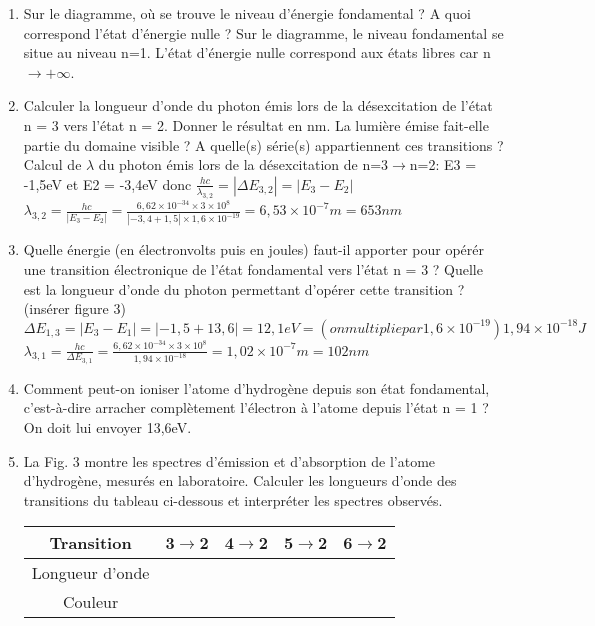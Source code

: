 \documentclass{article}
\begin{document}
\begin{enumerate}
    \item Sur le diagramme, où se trouve le niveau d’énergie fondamental ? A quoi correspond l’état d’énergie nulle ?\newline
    Sur le diagramme, le niveau fondamental se situe au niveau n=1. L'état d'énergie nulle correspond aux états libres car n$\to +\infty$.
    \item Calculer la longueur d’onde du photon émis lors de la désexcitation de l’état n = 3 vers l’état n = 2. Donner le résultat en nm. La lumière émise fait-elle partie du domaine visible ? A quelle(s) série(s) appartiennent ces transitions ?\newline
    Calcul de $\lambda$ du photon émis lors de la désexcitation de n=3$\to$n=2:
    E3 = -1,5eV et E2 = -3,4eV donc $\frac{hc}{\lambda_{3,2}} = |\Delta E_{3,2}| = |E_{3}-E_{2}|$\newline
    $\lambda_{3,2} = \frac{hc}{|E_{3}-E_{2}|} = \frac{6,62\times 10^{-34}\times 3\times 10^{8}}{|-3,4+1,5|\times 1,6\times 10^{-19}} = 6,53\times 10^{-7}m = 653nm$
    \item Quelle énergie (en électronvolts puis en joules) faut-il apporter pour opérér une transition électronique de l’état fondamental vers l’état n = 3 ? Quelle est la longueur d’onde du photon permettant d’opérer cette transition ? (insérer figure 3)\newline
    $\Delta E_{1,3} = |E_{3}-E_{1}| = |-1,5+13,6| = 12,1 eV = (on multiplie par 1,6\times 10^{-19}) 1,94\times 10^{-18}J$\newline
    $\lambda_{3,1} = \frac{hc}{\Delta E_{3,1}} = \frac{6,62\times 10^{-34}\times 3\times 10^{8}}{1,94\times 10^{-18}} = 1,02\times 10^{-7}m = 102nm$ 
    \item Comment peut-on ioniser l’atome d’hydrogène depuis son état fondamental, c’est-à-dire arracher complètement l’électron à l’atome depuis l’état n = 1 ?\newline
    On doit lui envoyer 13,6eV.
    \item La Fig. 3 montre les spectres d’émission et d’absorption de l’atome d’hydrogène, mesurés en laboratoire. Calculer les longueurs d’onde des transitions du tableau ci-dessous et interpréter les spectres observés.
    \begin{center}
        \begin{tabular}{|c|c|c|c|c|}
            \hline
            Transition & 3$\rightarrow$2 & 4$\rightarrow$2 & 5$\rightarrow$2 & 6$\rightarrow$2 \\
            \hline
            Longueur d'onde & & & & \\
            \hline
            Couleur & & & & \\
            \hline
        \end{tabular}
    \end{center}
\end{enumerate}
\end{document}
